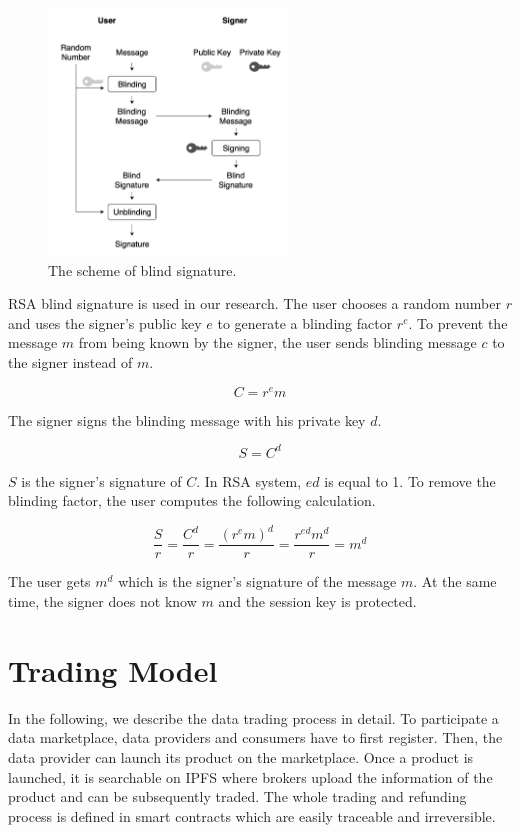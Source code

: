 \documentclass[conference]{IEEEtran}
\begin{document}
\begin{figure}[!t]
	\centering
	\includegraphics[width=2.5in]{blind_signature}
	\caption{The scheme of blind signature.}
	\label{fig:blind_signature}
\end{figure}

RSA blind signature\cite{cryptoNote} is used in our research. The user chooses a random number $r$ and uses the signer's public key $e$ to generate a blinding factor $r^e$. To prevent the message $m$ from being known by the signer, the user sends blinding message $c$ to the signer instead of $m$.

\begin{equation}
C = r^e m
\end{equation}

The signer signs the blinding message with his private key $d$.

\begin{equation}
S = C^d
\end{equation}

$S$ is the signer's signature of $C$. In RSA system, $ed$ is equal to 1. To remove the blinding factor, the user computes the following calculation.

\begin{equation}
\frac{S}{r}= \frac{C^d}{r} = \frac{(r^e m)^d}{r} = \frac{r^{ed} m^d}{r} = m^d
\end{equation}
 
The user gets $m^d$ which is the signer's signature of the message $m$. At the same time, the signer does not know $m$ and the session key is protected. 

\section{Trading Model}
In the following, we describe the data trading process in detail. To participate a data marketplace, data providers and consumers have to first register. Then,  the data provider can launch its product on the marketplace. Once a product is launched, it is searchable on IPFS where brokers upload the information of the product and can be subsequently traded. The whole trading and refunding process is defined in smart contracts which are easily traceable and irreversible.
\end{document}
